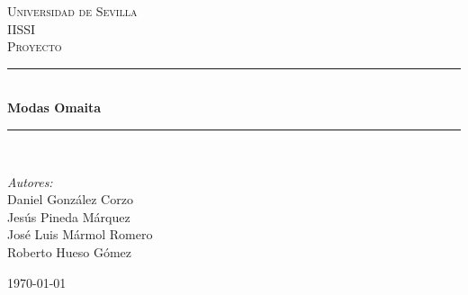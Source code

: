 \newcommand{\requit}[5]{\hrulefill \newline \textbf{#1} - #2 \requisito{#3}{#4}{#5}}



\begin{titlepage}

\newcommand{\HRule}{\rule{\linewidth}{0.5mm}} %

\center %
 

\textsc{\LARGE Universidad de Sevilla}\\[1.5cm] %
\textsc{\Large IISSI}\\[0.5cm] %
\textsc{\large Proyecto}\\[0.5cm] %


\HRule \\[0.4cm]
{ \huge \bfseries Modas Omaita}\\[0.4cm] %
\HRule \\[1.5cm]
 
\begin{minipage}{0.5\textwidth}
\large
\emph{Autores:}\\
Daniel González Corzo\\
Jesús Pineda Márquez\\
José Luis Mármol Romero \\
Roberto Hueso Gómez
\end{minipage}


\vspace{1cm}
{\large \today}\\[1cm] %


\end{titlepage}
